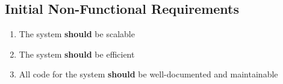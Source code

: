 \subsection{Initial Non-Functional Requirements}
\label{initial_non_functional_requirements}

\begin{enumerate}[label=\textbf{NF\arabic*:}]
  \item The system \textbf{should} be scalable
  \item The system \textbf{should} be efficient
  \item All code for the system \textbf{should} be well-documented and maintainable
\end{enumerate}
